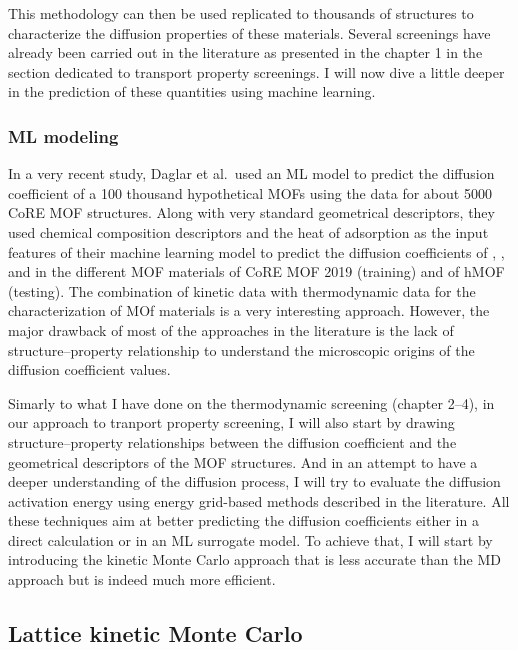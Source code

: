 \documentclass[main]{subfiles}
\begin{document}
This methodology can then be used replicated to thousands of structures to characterize the diffusion properties of these materials. Several screenings have already been carried out in the literature as presented in the chapter 1 in the section dedicated to transport property screenings. I will now dive a little deeper in the prediction of these quantities using machine learning.

\subsubsection{ML modeling}

In a very recent study, Daglar et al.\ used an ML model to predict the diffusion coefficient of a 100 thousand hypothetical MOFs using the data for about 5000 CoRE MOF structures.\autocite{Daglar_2022} Along with very standard geometrical descriptors, they used chemical composition descriptors and the heat of adsorption as the input features of their machine learning model to predict the diffusion coefficients of , ,  and  in the different MOF materials of CoRE MOF 2019 (training) and of hMOF (testing). The combination of kinetic data with thermodynamic data for the characterization of MOf materials is a very interesting approach. However, the major drawback of most of the approaches in the literature is the lack of structure--property relationship to understand the microscopic origins of the diffusion coefficient values.

Simarly to what I have done on the thermodynamic screening (chapter 2--4), in our approach to tranport property screening, I will also start by drawing structure--property relationships between the diffusion coefficient and the geometrical descriptors of the MOF structures. And in an attempt to have a deeper understanding of the diffusion process, I will try to evaluate the diffusion activation energy using energy grid-based methods described in the literature. All these techniques aim at better predicting the diffusion coefficients either in a direct calculation or in an ML surrogate model. To achieve that, I will start by introducing the kinetic Monte Carlo approach that is less accurate than the MD approach but is indeed much more efficient.

\subsection{Lattice kinetic Monte Carlo}
\end{document}
